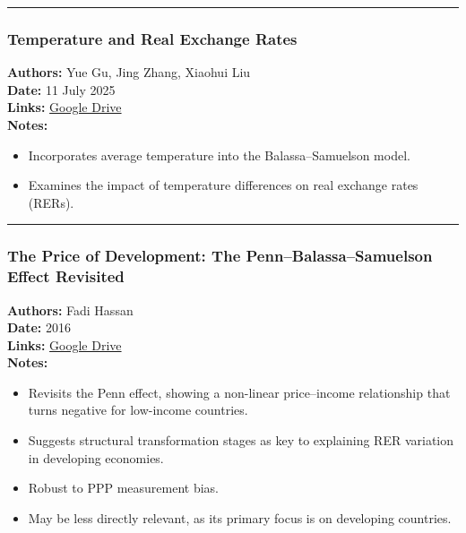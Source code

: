 \documentclass[
  11pt,
]{article}
\providecommand{\tightlist}{%
  \setlength{\itemsep}{0pt}\setlength{\parskip}{0pt}}
\begin{document}
\begin{center}\rule{0.5\linewidth}{0.5pt}\end{center}

\subsubsection{Temperature and Real Exchange
Rates}\label{temperature-and-real-exchange-rates}

\textbf{Authors:} Yue Gu, Jing Zhang, Xiaohui Liu\\
\textbf{Date:} 11 July 2025\\
\textbf{Links:}
\href{https://drive.google.com/file/d/1mEMh-d8eDPpk9WaKuob5Wz34xlObrjSt/view?usp=sharing}{Google
Drive}\\
\textbf{Notes:}

\begin{itemize}
\tightlist
\item
  Incorporates average temperature into the Balassa--Samuelson model.
\item
  Examines the impact of temperature differences on real exchange rates
  (RERs).
\end{itemize}

\begin{center}\rule{0.5\linewidth}{0.5pt}\end{center}

\subsubsection{The Price of Development: The Penn--Balassa--Samuelson
Effect
Revisited}\label{the-price-of-development-the-pennbalassasamuelson-effect-revisited}

\textbf{Authors:} Fadi Hassan\\
\textbf{Date:} 2016\\
\textbf{Links:}
\href{https://drive.google.com/file/d/1bWMV2iq0ZnGvyt1L25UzIOewSEYH5uBC/view?usp=sharing}{Google
Drive}\\
\textbf{Notes:}

\begin{itemize}
\tightlist
\item
  Revisits the Penn effect, showing a non-linear price--income
  relationship that turns negative for low-income countries.
\item
  Suggests structural transformation stages as key to explaining RER
  variation in developing economies.
\item
  Robust to PPP measurement bias.
\item
  May be less directly relevant, as its primary focus is on developing
  countries.
\end{itemize}
\end{document}
